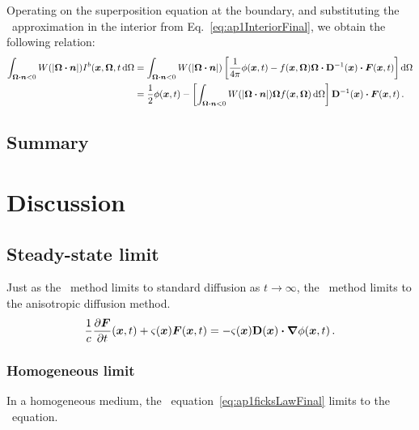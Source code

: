 Operating on the superposition equation at the boundary, and substituting the
\APone\ approximation in the interior from Eq.~\eqref{eq:ap1InteriorFinal}, we
obtain the following relation:
\begin{align*}
  \int_{\bm{\Omega}\bm{\cdot}\bm{n} < 0}
  W(\left| \bm{\Omega}\bm{\cdot}\bm{n} \right|) I^b(\bm{x},\bm{\Omega},t \mathop{}\!\mathrm{d}\Omega
 &= 
 \int_{\bm{\Omega}\bm{\cdot}\bm{n} < 0}
  W(\left| \bm{\Omega}\bm{\cdot}\bm{n} \right|) \left[ \frac{1}{4\pi} \phi(\bm{x},t)
  - f(\bm{x},\bm{\Omega}) \bm{\Omega} \bm{\cdot}
  \mathbf{D}^{-1}(\bm{x}) \bm{\cdot} \bm{F}(\bm{x},t)\right] \mathop{}\!\mathrm{d}\Omega
\\
&= \frac{1}{2} \phi(\bm{x},t)
-  \left[ \int_{\bm{\Omega}\bm{\cdot}\bm{n} < 0} W(\left| \bm{\Omega}\bm{\cdot}\bm{n} \right|)
  \bm{\Omega} f(\bm{x},\bm{\Omega}) \mathop{}\!\mathrm{d}\Omega\right]
 \mathbf{D}^{-1}(\bm{x}) \bm{\cdot} \bm{F}(\bm{x},t) \,.
\end{align*}

\subsection{Summary}

\section{Discussion}



\subsection{Steady-state limit}
Just as the \Pone\ method limits to standard diffusion as $t\to\infty$, the
\APone\ method limits to the anisotropic diffusion method.
\begin{equation*}
  \frac{1}{c}\frac{\partial \bm{F}}{\partial t}(\bm{x},t) + \varsigma(\bm{x})\bm{F}(\bm{x},t) 
  = - \varsigma(\bm{x}) \mathbf{D}(\bm{x}) \bm{\cdot} \bm{\nabla} \phi(\bm{x}, t) \,.
\end{equation*}

\subsubsection{Homogeneous limit}
In a homogeneous medium, the \APone\ equation~\eqref{eq:ap1ficksLawFinal} limits
to the \Pone\ equation.

